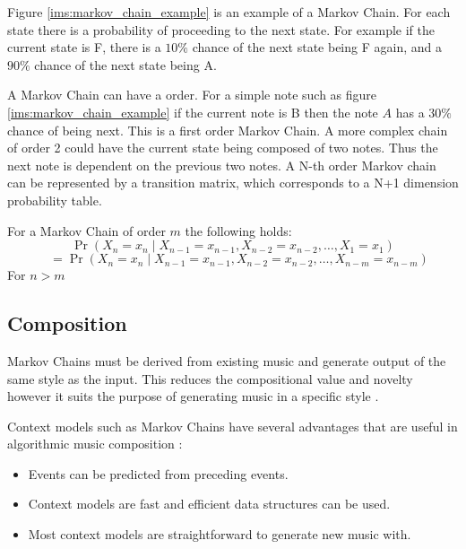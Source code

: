 Figure \ref{ims:markov_chain_example} is an example of a Markov Chain. For each state there is a probability of proceeding to the next state. For example if the current state is F, there is a $10\%$ chance of the next state being F again, and a $90\%$ chance of the next state being A.

A Markov Chain can have a order. For a simple note such as figure \ref{ims:markov_chain_example} if the current note is B then the note $A$ has a $30\%$ chance of being next. This is a first order Markov Chain.  A more complex chain of order 2 could have the current state being composed of two notes. Thus the next note is dependent on the previous two notes. A N-th order Markov chain can be represented by a transition matrix, which corresponds to a N+1 dimension probability table.

For a Markov Chain of order $m$ the following holds:
\[
\Pr(X_n=x_n\mid X_{n-1}=x_{n-1}, X_{n-2}=x_{n-2}, \dots , X_1=x_1)
\]
\[\quad = \Pr(X_n=x_n\mid X_{n-1}=x_{n-1}, X_{n-2}=x_{n-2}, \dots, X_{n-m}=x_{n-m})
\]
For $n > m$

\subsection{Composition}
Markov Chains must be derived from existing music and generate output of the same style as the input. This reduces the compositional value and novelty however it suits the purpose of generating music in a specific style \cite{Jarvelainen2000}.

Context models such as Markov Chains have several advantages that are useful in algorithmic music composition \cite{Conklin2003}:
\begin{itemize}
\item Events can be predicted from preceding events.
\item Context models are fast and efficient data structures can be used.
\item Most context models are straightforward to generate new music with.
\end{itemize}

